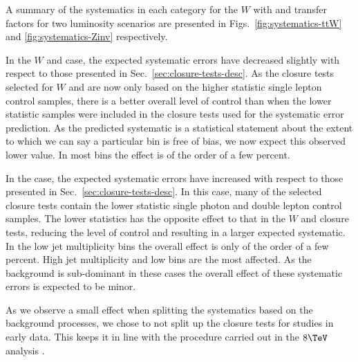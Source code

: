A summary of the systematics in each category for the $W$ with \ttbar 
and \znunu transfer factors for two luminosity scenarios are presented in
Figs.~\ref{fig:systematics-ttW} and \ref{fig:systematics-Zinv}
respectively. 

In the $W$ and \ttbar case, the expected systematic errors have decreased 
slightly with respect to those presented in
Sec.~\ref{sec:closure-tests-desc}. As the
closure tests selected for $W$ and \ttbar are now only based on the higher
statistic single lepton control samples, there is a better overall level of
control than when the lower statistic samples were included in the
closure tests used for the systematic error prediction. As the
predicted systematic is a statistical statement about the
extent to which we can say a particular bin is free of bias, we now 
expect this observed lower value. In most bins the
effect is of the order of a few percent.

In the \znunu case, the expected systematic errors have increased with
respect to those presented in Sec.~\ref{sec:closure-tests-desc}. In
this case, many of the selected closure tests contain the lower
statistic single photon and double lepton control samples. The lower
statistics has the opposite effect to that in the $W$ and \ttbar closure 
tests, reducing the level of control and resulting in a larger
expected systematic. In the low jet multiplicity bins the overall
effect is only of the order of a few percent. High jet multiplicity
and low \scalht bins are the most affected. As the \znunu
background is sub-dominant in these cases the overall effect of these
systematic errors is expected to be minor.

As we observe a small effect when splitting the systematics based on
the background processes, we chose to not split up the closure
tests for studies in early data. This keeps it in line with the
procedure carried out in the $8\tev$ analysis \cite{CMS_AN_2013-366}.


